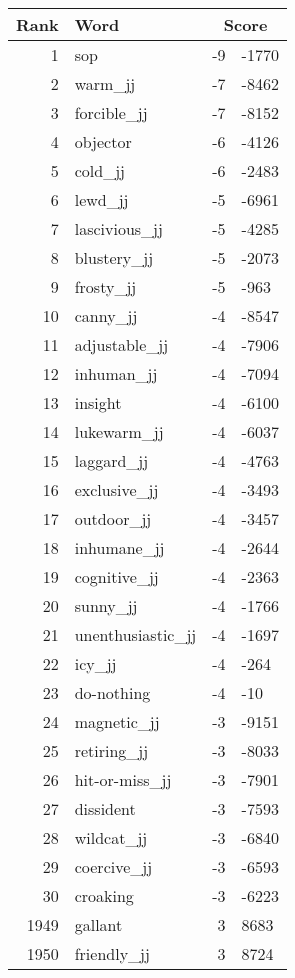 \begin{longtable}[!htbp]{| rlr@{.}l |}
    \hline
    \textbf{Rank} & \textbf{Word} & \multicolumn{2}{c|}{\textbf{Score}} \\
    \hline
    \endhead
    1 & sop & -9 & -1770 \\
    2 & warm\_jj & -7 & -8462 \\
    3 & forcible\_jj & -7 & -8152 \\
    4 & objector & -6 & -4126 \\
    5 & cold\_jj & -6 & -2483 \\
    6 & lewd\_jj & -5 & -6961 \\
    7 & lascivious\_jj & -5 & -4285 \\
    8 & blustery\_jj & -5 & -2073 \\
    9 & frosty\_jj & -5 & -963 \\
    10 & canny\_jj & -4 & -8547 \\
    11 & adjustable\_jj & -4 & -7906 \\
    12 & inhuman\_jj & -4 & -7094 \\
    13 & insight & -4 & -6100 \\
    14 & lukewarm\_jj & -4 & -6037 \\
    15 & laggard\_jj & -4 & -4763 \\
    16 & exclusive\_jj & -4 & -3493 \\
    17 & outdoor\_jj & -4 & -3457 \\
    18 & inhumane\_jj & -4 & -2644 \\
    19 & cognitive\_jj & -4 & -2363 \\
    20 & sunny\_jj & -4 & -1766 \\
    21 & unenthusiastic\_jj & -4 & -1697 \\
    22 & icy\_jj & -4 & -264 \\
    23 & do-nothing & -4 & -10 \\
    24 & magnetic\_jj & -3 & -9151 \\
    25 & retiring\_jj & -3 & -8033 \\
    26 & hit-or-miss\_jj & -3 & -7901 \\
    27 & dissident & -3 & -7593 \\
    28 & wildcat\_jj & -3 & -6840 \\
    29 & coercive\_jj & -3 & -6593 \\
    30 & croaking & -3 & -6223 \\
    1949 & gallant & 3 & 8683 \\
    1950 & friendly\_jj & 3 & 8724 \\

\end{longtable}
